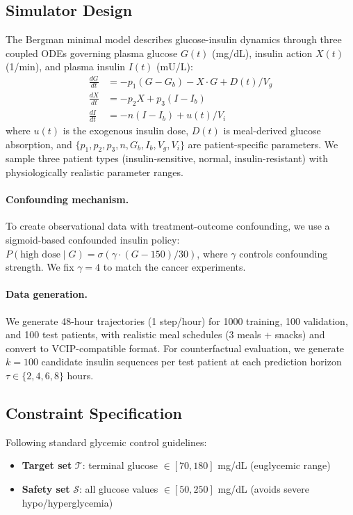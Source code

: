 \documentclass{article}
\newcommand{\cT}{\mathcal{T}}
\newcommand{\cS}{\mathcal{S}}
\begin{document}
\subsection{Simulator Design}

The Bergman minimal model describes glucose-insulin dynamics through three coupled ODEs governing plasma glucose $G(t)$ (mg/dL), insulin action $X(t)$ (1/min), and plasma insulin $I(t)$ (mU/L):
\begin{align}
\frac{dG}{dt} &= -p_1(G - G_b) - X \cdot G + D(t)/V_g \\
\frac{dX}{dt} &= -p_2 X + p_3(I - I_b) \\
\frac{dI}{dt} &= -n(I - I_b) + u(t)/V_i
\end{align}
where $u(t)$ is the exogenous insulin dose, $D(t)$ is meal-derived glucose absorption, and $\{p_1, p_2, p_3, n, G_b, I_b, V_g, V_i\}$ are patient-specific parameters. We sample three patient types (insulin-sensitive, normal, insulin-resistant) with physiologically realistic parameter ranges.

\paragraph{Confounding mechanism.}
To create observational data with treatment-outcome confounding, we use a sigmoid-based confounded insulin policy:
$P(\text{high dose} \mid G) = \sigma(\gamma \cdot (G - 150)/30)$,
where $\gamma$ controls confounding strength. We fix $\gamma = 4$ to match the cancer experiments.

\paragraph{Data generation.}
We generate 48-hour trajectories (1 step/hour) for 1000 training, 100 validation, and 100 test patients, with realistic meal schedules (3 meals + snacks) and convert to VCIP-compatible format. For counterfactual evaluation, we generate $k = 100$ candidate insulin sequences per test patient at each prediction horizon $\tau \in \{2, 4, 6, 8\}$ hours.

\subsection{Constraint Specification}

Following standard glycemic control guidelines:
\begin{itemize}
\item \textbf{Target set} $\cT$: terminal glucose $\in [70, 180]$ mg/dL (euglycemic range)
\item \textbf{Safety set} $\cS$: all glucose values $\in [50, 250]$ mg/dL (avoids severe hypo/hyperglycemia)
\end{itemize}
\end{document}
